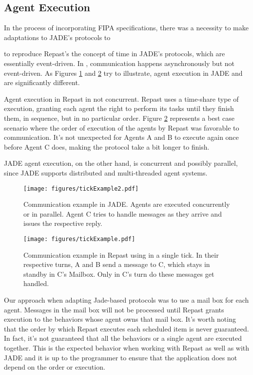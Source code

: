\subsection{Agent Execution}

In the process of incorporating FIPA specifications, there was a necessity to make adaptations to JADE's protocols to

to reproduce Repast's the concept of time in JADE's protocols, which are essentially event-driven. In \apiname{}, communication happens asynchronously but not event-driven. As Figures \ref{fig:com-example-jade} and \ref{fig:com-example-repast} try to illustrate, agent execution in JADE and \apiname{} are significantly different.

Agent execution in Repast in not concurrent. Repast uses a time-share type of execution, granting each agent the right to perform its tasks until they finish them, in sequence, but in no particular order. Figure \ref{fig:com-example-repast} represents a best case scenario where the order of execution of the agents by Repast was favorable to communication. It's not unexpected for Agents A and B to execute again once before Agent C does, making the protocol take a bit longer to finish.

JADE agent execution, on the other hand, is concurrent and possibly parallel, since JADE supports distributed and multi-threaded agent systems.

\begin{figure}[h]
	\centering
	\texttt{[image: figures/tickExample2.pdf]}
	\caption{
		Communication example in JADE. Agents are executed concurrently or in parallel. Agent C tries to handle messages as they arrive and issues the respective reply.
	}
	\label{fig:com-example-jade}
\end{figure}

\begin{figure}[h]
	\centering
	\texttt{[image: figures/tickExample.pdf]}
	\caption{
		Communication example in Repast using \apiname{} in a single tick. In their respective turns, A and B send a message to C, which stays in standby in C's Mailbox. Only in C's turn do these messages get handled.
	}
	\label{fig:com-example-repast}
\end{figure}

Our approach when adapting Jade-based protocols was to use a mail box for each agent. Messages in the mail box will not be processed until Repast grants execution to the behaviors whose agent owns that mail box. It's worth noting that the order by which Repast executes each scheduled item is never guaranteed. In fact, it's not guaranteed that all the behaviors or a single agent are executed together. This is the expected behavior when working with Repast as well as with JADE and it is up to the programmer to ensure that the application does not depend on the order or execution.

